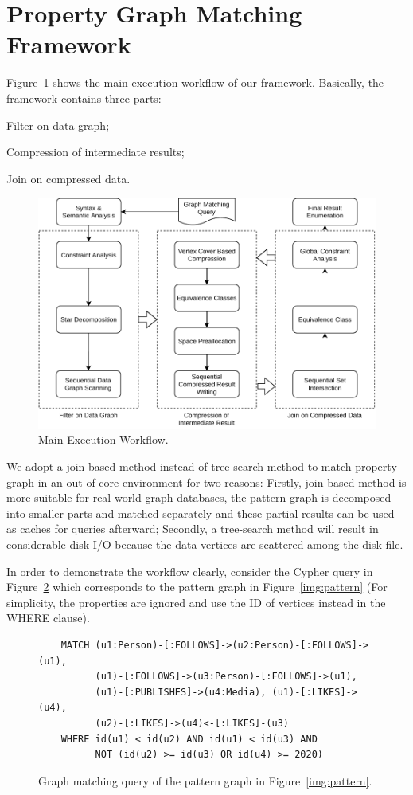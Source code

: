 \section{Property Graph Matching Framework}\label{sec:framework}
Figure~\ref{img:framework} shows the main execution workflow of our framework.
Basically, the framework contains three parts:
\begin{enumerate*}[label={\arabic*.}]
\item Filter on data graph;
\item Compression of intermediate results;
\item Join on compressed data.
\end{enumerate*}
\begin{figure}[ht]
  \centering
  \includegraphics[width=.48\textwidth]{img/framework.pdf}
  \caption{Main Execution Workflow.}\label{img:framework}
\end{figure}
We adopt a join-based method instead of tree-search method to match property graph in an out-of-core environment for two reasons:
Firstly, join-based method is more suitable for real-world graph databases,
the pattern graph is decomposed into smaller parts and matched separately and these partial results can be used as caches for queries afterward;
Secondly, a tree-search method will result in considerable disk I/O because the data vertices are scattered among the disk file.

In order to demonstrate the workflow clearly,
consider the Cypher query in Figure~\ref{img:cypher_query} which corresponds to the pattern graph in Figure~\ref{img:pattern}
(For simplicity, the properties are ignored and use the ID of vertices instead in the WHERE clause).
\begin{figure}[ht]
  \begin{verbatim}
    MATCH (u1:Person)-[:FOLLOWS]->(u2:Person)-[:FOLLOWS]->(u1),
          (u1)-[:FOLLOWS]->(u3:Person)-[:FOLLOWS]->(u1),
          (u1)-[:PUBLISHES]->(u4:Media), (u1)-[:LIKES]->(u4),
          (u2)-[:LIKES]->(u4)<-[:LIKES]-(u3)
    WHERE id(u1) < id(u2) AND id(u1) < id(u3) AND
          NOT (id(u2) >= id(u3) OR id(u4) >= 2020)
  \end{verbatim}
  \caption{Graph matching query of the pattern graph in Figure~\ref{img:pattern}.}\label{img:cypher_query}
\end{figure}

